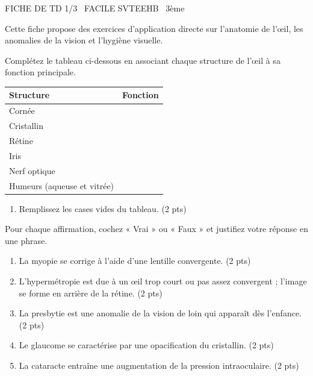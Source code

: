 \documentclass[11pt]{article}
\begin{document}
\begin{tcolorbox}[enhanced,colback=popink,colframe=popink,arc=10pt,boxrule=0pt,left=12pt,right=12pt,top=9pt,bottom=9pt]
{\color{white}\popxbold\small FICHE DE TD 1/3 \textbullet\ FACILE \hfill SVTEEHB \textbullet\ 3ème\par}
\end{tcolorbox}
\vspace{4pt}
Cette fiche propose des exercices d'application directe sur l'anatomie de l'œil, les anomalies de la vision et l'hygiène visuelle.

\begin{exercice}
Complétez le tableau ci-dessous en associant chaque structure de l'œil à sa fonction principale.
\begin{center}
\begin{tabular}{|p{3.5cm}|p{10cm}|}
\hline
\textbf{Structure} & \textbf{Fonction} \\
\hline
Cornée & \\
\hline
Cristallin & \\
\hline
Rétine & \\
\hline
Iris & \\
\hline
Nerf optique & \\
\hline
Humeurs (aqueuse et vitrée) & \\
\hline
\end{tabular}
\end{center}
\begin{enumerate}
    \item Remplissez les cases vides du tableau. \hfill (2 pts)
\end{enumerate}
\end{exercice}

\begin{exercice}
Pour chaque affirmation, cochez « Vrai » ou « Faux » et justifiez votre réponse en une phrase.
\begin{enumerate}
    \item La myopie se corrige à l'aide d'une lentille convergente. \hfill (2 pts)
    \item L'hypermétropie est due à un œil trop court ou pas assez convergent ; l'image se forme en arrière de la rétine. \hfill (2 pts)
    \item La presbytie est une anomalie de la vision de loin qui apparaît dès l'enfance. \hfill (2 pts)
    \item Le glaucome se caractérise par une opacification du cristallin. \hfill (2 pts)
    \item La cataracte entraîne une augmentation de la pression intraoculaire. \hfill (2 pts)
\end{enumerate}
\end{exercice}
\end{document}
